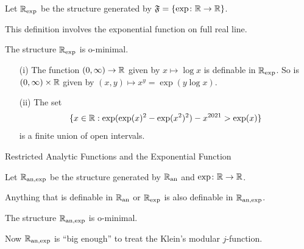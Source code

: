 \documentclass{beamer}
\begin{document}
\begin{frame}
  \begin{definition}
    Let ${{\mathbb{R}}_{\mathrm{exp}}}$ be the structure generated by
    $\mathfrak{F} = \{ \exp \colon {\mathbb{R}}\rightarrow{\mathbb{R}}\}$. 
  \end{definition}

This definition involves the exponential function on \alert{full}
{real} line.

\begin{theorem}[Wilkie]
  The structure ${{\mathbb{R}}_{\mathrm{exp}}}$ is o-minimal.
\end{theorem}

\begin{example}
  \begin{enumerate}
  \item [(i)]
    The function $(0,\infty)\rightarrow{\mathbb{R}}$ given by $x\mapsto \log x$
    is definable in ${{\mathbb{R}}_{\mathrm{exp}}}$.
    So is $(0,\infty)\times{\mathbb{R}}$ given by $(x,y)\mapsto x^y = \exp(y\log x)$.
  \item[(ii)]The set
      $$\{x\in{\mathbb{R}} : \exp(\exp(x)^2-\exp(x^2)^2)-x^{2021} > \exp(x)\}$$
      is a finite union of open intervals.
  \end{enumerate}
\end{example}
\end{frame}

\begin{frame}{Restricted Analytic Functions and the Exponential Function}

  \begin{definition}
    Let ${{\mathbb{R}}_{\mathrm{an,exp}}}$ be the structure generated by 
    ${{\mathbb{R}}_{\mathrm{an}}}$
    and $\exp \colon {\mathbb{R}}\rightarrow{\mathbb{R}}$.
  \end{definition}

  Anything that is definable in ${{\mathbb{R}}_{\mathrm{an}}}$ or ${{\mathbb{R}}_{\mathrm{exp}}}$ is also definable
  in  ${{\mathbb{R}}_{\mathrm{an,exp}}}$.

  \begin{theorem}
    The structure ${{\mathbb{R}}_{\mathrm{an,exp}}}$ is o-minimal.
  \end{theorem}

  Now ${{\mathbb{R}}_{\mathrm{an,exp}}}$ is ``big enough'' to treat the Klein's
  modular $j$-function. 

\end{frame}
\end{document}
